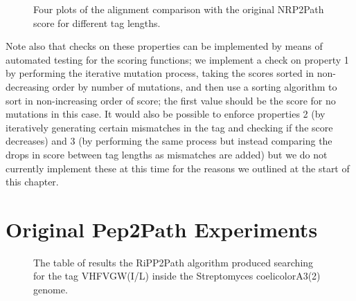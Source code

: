 \documentclass{l4proj}
\begin{document}
\begin{figure} \label{fig:p2ps}
    \centering

    \caption{Four plots of the alignment comparison with the original NRP2Path score for different tag lengths.}

    \label{fig:p2ps}
\end{figure}

Note also that checks on these properties can be implemented by means of automated testing for the scoring functions; we implement a check on property 1 by performing the iterative mutation process, taking the scores sorted in non-decreasing order by number of mutations, and then use a sorting algorithm to sort in non-increasing order of score; the first value should be the score for no mutations in this case. It would also be possible to enforce properties 2 (by iteratively generating certain mismatches in the tag and checking if the score decreases) and 3 (by performing the same process but instead comparing the drops in score between tag lengths as mismatches are added) but we do not currently implement these at this time for the reasons we outlined at the start of this chapter.

\section{Original Pep2Path Experiments}

\begin{figure} \label{fig:ripp2path}
    \centering

    \caption{The table of results the RiPP2Path algorithm produced searching for the tag VHFVGW(I/L) inside the Streptomyces coelicolorA3(2) genome.}

    \label{fig:ripp2path}
\end{figure}
\end{document}
